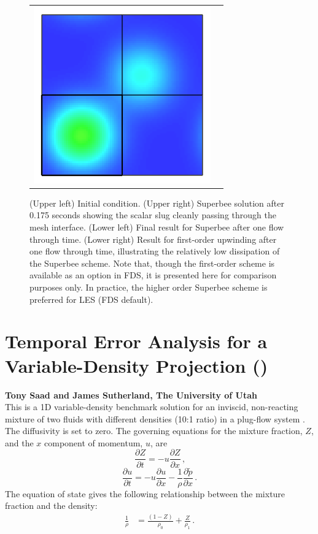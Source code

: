 \documentclass[11pt]{book}
\begin{document}
\begin{figure}[p]
\begin{tabular}{rl}
      \includegraphics[width=3in]{SCRIPT_FIGURES/move_slug_FL1_tf} \\
   \end{tabular}
   \caption[Multi-mesh square wave transport]{(Upper left) Initial condition. (Upper right) Superbee solution after 0.175 seconds showing the scalar slug cleanly passing through the mesh interface. (Lower left) Final result for Superbee after one flow through time.  (Lower right) Result for first-order upwinding after one flow through time, illustrating the relatively low dissipation of the Superbee scheme.  Note that, though the first-order scheme is available as an option in FDS, it is presented here for comparison purposes only.  In practice, the higher order Superbee scheme is preferred for LES (FDS default).}
   \label{fig_move_slug}
\end{figure}

\clearpage

\section{Temporal Error Analysis for a Variable-Density Projection (\texorpdfstring{}{saad})}
\label{sec:saad_temporal_error}

\textbf{Tony Saad and James Sutherland, The University of Utah}\\

\noindent This is a 1D variable-density benchmark solution for an inviscid, non-reacting mixture of two fluids with different densities (10:1 ratio) in a plug-flow system \cite{Biglari:2013}.  The diffusivity is set to zero.  The governing equations for the mixture fraction, $Z$, and the $x$ component of momentum, $u$, are
\begin{equation}
\frac{\partial Z}{\partial t} = - u\frac{\partial Z}{\partial x} \,\mbox{,}
\end{equation}
\begin{equation}
\frac{\partial u}{\partial t} = - u\frac{\partial u}{\partial x} - \frac{1}{\rho} \frac{\partial \tilde{p}}{\partial x} \,\mbox{.}
\end{equation}
The equation of state gives the following relationship between the mixture fraction and the density:
\begin{align}
\frac{1}{\rho} &= \frac{(1-Z)}{\rho_0} + \frac{Z}{\rho_1} \,\mbox{.}
\end{align}
\end{document}
